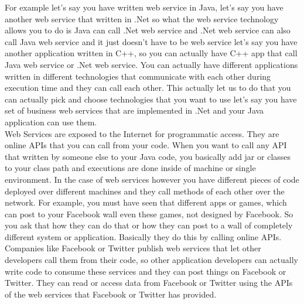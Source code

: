 For example let’s say you have written web service in Java, let’s say you have another web service that written in .Net so what
the web service technology allows you to do is Java can call .Net web service and .Net web service can also call Java web
service and it just doesn’t have to be web service let’s say you have another application written in C++, so you can actually
have C++ app that call Java web service or .Net web service. You can actually have different applications written in different
technologies that communicate with each other during execution time and they can call each other. This actually let us to do that
you can actually pick and choose technologies that you want to use let’s say you have set of business web services that are
implemented in .Net and your Java application can use them.\\

Web Services are exposed to the Internet for programmatic access. They are online APIs that you can call from your code.
When you want to call any API that written by someone else to your Java code, you basically add jar or classes to your class
path and executions are done inside of machine or single environment. In the case of web services however you have different
pieces of code deployed over different machines and they call methods of each other over the network. For example, you must
have seen that different apps or games, which can post to your Facebook wall even these games, not designed by Facebook.
So you ask that how they can do that or how they can post to a wall of completely different system or application. Basically
they do this by calling online APIs. Companies like Facebook or Twitter publish web services that let other developers call
them from their code, so other application developers can actually write code to consume these services and they can post
things on Facebook or Twitter. They can read or access data from Facebook or Twitter using the APIs of the web services that
Facebook or Twitter has provided.\\

